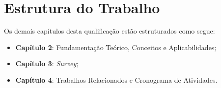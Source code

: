 \section{Estrutura do Trabalho}\label{sec:estruturadotrabalho}

Os demais capítulos desta qualificação estão estruturados como segue: 
\begin{itemize}
\item \textbf{Capítulo 2}: Fundamentação Teórico, Conceitos e Aplicabilidades;
\item \textbf{Capítulo 3}: \textit{Survey};
\item \textbf{Capítulo 4}: Trabalhos Relacionados e Cronograma de Atividades.
\end{itemize}